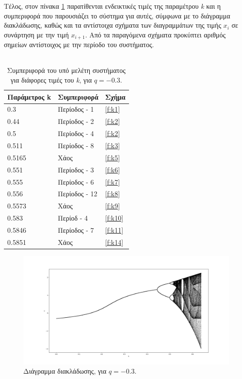 Τέλος, στον πίνακα \ref{tab:abc1} παρατίθενται ενδεικτικές τιμές της παραμέτρου \emph{k} και η συμπεριφορά που παρουσιάζει το σύστημα για αυτές, σύμφωνα με το διάγραμμα διακλάδωσης, καθώς και τα αντίστοιχα σχήματα των διαγραμμάτων της τιμής \(x_i\) σε συνάρτηση με την τιμή \(x_{i+1}\). Από τα παραγόμενα σχήματα προκύπτει αριθμός σημείων αντίστοιχος με την περίοδο του συστήματος.\\\\

\begin{table}[ht]
	\centering
	\caption{ Συμπεριφορά του υπό μελέτη συστήματος για διάφορες τιμές του \emph{k}, για $q=-0.3$.}
	\label{tab:abc1}
	\begin{tabular}{l | l | l}
		Παράμετρος k & Συμπεριφορά & Σχήμα\\
		\hline
		0.3 &  Περίοδος - 1 & \ref{f:k1}\\
		0.44& Περίοδος - 2 & \ref{f:k2}\\
		0.5& Περίοδος - 4 & \ref{f:k2}\\
		0.511 &  Περίοδος - 8 & \ref{f:k3}\\
		0.5165 & Χάος & \ref{f:k5}\\
		0.551 & Περίοδος - 3 & \ref{f:k6}\\
		0.555 & Περίοδος - 6 & \ref{f:k7}\\
		0.556 & Περίοδος - 12 & \ref{f:k8}\\
		0.5573 & Χάος & \ref{f:k9}\\
		0.583& Περίοδ - 4 & \ref{f:k10}\\
		0.5846 & Περίοδος - 7 & \ref{f:k11}\\
		0.5851 & Χάος & \ref{f:k14}\\
	\end{tabular}
	
\end{table}

\begin{figure}[ht]
	\centering
	\includegraphics[width=1\linewidth]{LateX images/graphs q03/g1}
	\caption{ Διάγραμμα διακλάδωσης, για $q=-0.3$.}
	\label{f:g8}
\end{figure}

